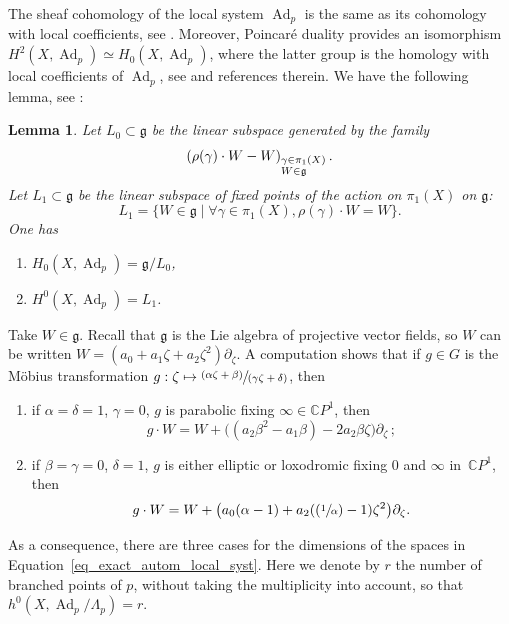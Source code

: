 \documentclass[JEP,XML,SOM,Unicode,NoEqCountersInSection,published]{cedram}
\newcommand\mto{\mathchoice{\longmapsto}{\mapsto}{\mapsto}{\mapsto}}
\newcommand{\Psfrac}[2]{(\sfrac{#1}{#2})}
\newcommand{\pspfrac}[2]{\sfrac{(#1)}{(#2)}}
\newcommand{\CP}{\mathbb CP}
\DeclareMathOperator{\Ad}{Ad}
\theoremstyle{definition}
\theoremstyle{plain}
\newtheorem{lemma}[definition]{Lemma}
\begin{document}
The sheaf cohomology of the local system $\Ad_p$ is the same as its cohomology with local coefficients, see \cite{steenrod}.
Moreover, Poincaré duality provides an isomorphism $H^2\left(X, \Ad_p\right) \simeq H_0\left(X, \Ad_p\right)$, where the latter group is the homology with local coefficients of $\Ad_p$, see \cite{sun} and references therein.
We have the following lemma, see \cite{whitehead}:

\begin{lemma}
Let $L_0 \subset \mathfrak g$ be the linear subspace generated by the family
\[
\left(\rho(\gamma)\cdot W - W\right)_{\begin{subarray}{1}\gamma \in \pi_1(X) \\ W \in \mathfrak g \end{subarray}}.
\]
Let $L_1 \subset \mathfrak g$ be the linear subspace of fixed points of the action on $\pi_1(X)$ on $\mathfrak g$:
\[
L_1 = \{W \in \mathfrak g \mid \forall \gamma \in \pi_1(X), \rho(\gamma) \cdot W = W\}.
\]
One has
\begin{enumerate}
\item
$H_0\left(X, \Ad_p\right) = \mathfrak g / L_0$,
\item
$H^0\left(X, \Ad_p\right) = L_1$.
\end{enumerate}
\end{lemma}
Take $W \in \mathfrak g$.
Recall that $\mathfrak g$ is the Lie algebra of projective vector fields, so $W$ can be written $W = \left(a_0 + a_1 \zeta + a_2 \zeta^2 \right) \partial_{\zeta}$.
A computation shows that if $g \in G$ is the Möbius transformation $g: \zeta \mto \pspfrac{\alpha \zeta + \beta}{\gamma \zeta + \delta}$, then
\begin{enumerate}
\item
if $\alpha = \delta = 1$, $\gamma = 0$, \ie $g$ is parabolic fixing $\infty \in \CP^1$, then
\[
g \cdot W = W + \bigl((a_2 \beta^2 - a_1 \beta) - 2a_2 \beta \zeta\bigr) \partial_{\zeta}\,;
\]
\item
if $\beta \!=\! \gamma \!=\! 0$, $\delta \!=\! 1$, \ie $g$ is either elliptic or loxodromic fixing $0$ and $\infty$ in~$\CP^1$, then
\[
g \cdot W = W + \bigl(a_0(\alpha-1) + a_2(\Psfrac{1}{\alpha} - 1)\zeta^2\bigr)\partial_{\zeta}.
\]
\end{enumerate}
As a consequence, there are three cases for the dimensions of the spaces in Equation~\eqref{eq_exact_autom_local_syst}.
Here we denote by $r$ the number of branched points of $p$, without taking the multiplicity into account, so that $h^0\left(X, \Ad_p / \Lambda_p\right) = r$.
\end{document}
